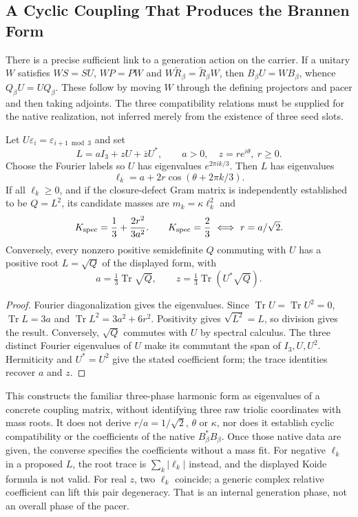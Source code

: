 \subsection{A Cyclic Coupling That Produces the Brannen Form}
\label{v480:generation-cyclic}

There is a precise sufficient link to a generation action on the
carrier. If a unitary $W$ satisfies $WS=SU$, $WP=PW$ and
$W\widetilde R_\beta=\widetilde R_\beta W$, then
$B_\beta U=WB_\beta$, whence $Q_\beta U=UQ_\beta$.
These follow by moving $W$ through the defining projectors and
pacer and then taking adjoints. The three compatibility relations
must be supplied for the native realization, not inferred merely
from the existence of three seed slots.

\begin{proposition}
\label{v480:generation-cyclic-root}
Let $U\varepsilon_i=\varepsilon_{i+1\bmod3}$ and set
\[
 L=aI_3+zU+\bar zU^*,\qquad a>0,\quad z=r e^{i\theta},\ r\geq0.
\]
Choose the Fourier labels so $U$ has eigenvalues
$e^{2\pi i k/3}$. Then $L$ has eigenvalues
\[
 \ell_k=a+2r\cos(\theta+2\pi k/3).
\]
If all $\ell_k\geq0$, and if the closure-defect Gram matrix is
independently established to be $Q=L^2$, its candidate masses are
$m_k=\kappa\ell_k^2$ and
\[
 K_{\rm spec}=\frac13+\frac{2r^2}{3a^2}.
 \qquad K_{\rm spec}=\frac23\ \Longleftrightarrow\ r=a/\sqrt2.
\]
Conversely, every nonzero positive semidefinite $Q$ commuting with
$U$ has a positive root $L=\sqrt Q$ of the displayed form, with
\[
 a=\tfrac13\operatorname{Tr}\sqrt Q,\qquad
 z=\tfrac13\operatorname{Tr}(U^*\sqrt Q).
\]
\end{proposition}
\begin{proof}
Fourier diagonalization gives the eigenvalues. Since
$\operatorname{Tr}U=\operatorname{Tr}U^2=0$,
$\operatorname{Tr}L=3a$ and
$\operatorname{Tr}L^2=3a^2+6r^2$.
Positivity gives $\sqrt{L^2}=L$, so division gives the result.
Conversely, $\sqrt Q$ commutes with $U$ by spectral calculus.
The three distinct Fourier eigenvalues of $U$ make its commutant
the span of $I_3,U,U^2$. Hermiticity and $U^*=U^2$ give the stated
coefficient form; the trace identities recover $a$ and $z$.
\end{proof}

This constructs the familiar three-phase harmonic form as eigenvalues
of a concrete coupling matrix, without identifying three raw triolic
coordinates with mass roots. It does not derive $r/a=1/\sqrt2$,
$\theta$ or $\kappa$, nor does it establish cyclic compatibility
or the coefficients of the native $B_\beta^*B_\beta$. Once those
native data are given, the converse specifies the coefficients
without a mass fit. For negative $\ell_k$ in a proposed $L$,
the root trace is $\sum_k|\ell_k|$ instead, and the displayed Koide
formula is not valid. For real $z$, two $\ell_k$ coincide; a generic
complex relative coefficient can lift this pair degeneracy. That is
an internal generation phase, not an overall phase of the pacer.

